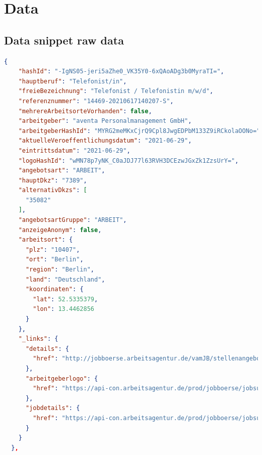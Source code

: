 \documentclass[12pt, a4paper, titlepage]{article}
\begin{document}


\clearpage





\newpage
\appendix
\section{Data}
\subsection{Data snippet raw data}
\begin{lstlisting}[language=json]
  {
    "hashId": "-IgNS05-jeri5aZhe0_VK35Y0-6xQAoADg3b0MyraTI=",
    "hauptberuf": "Telefonist/in",
    "freieBezeichnung": "Telefonist / Telefonistin m/w/d",
    "referenznummer": "14469-20210617140207-S",
    "mehrereArbeitsorteVorhanden": false,
    "arbeitgeber": "aventa Personalmanagement GmbH",
    "arbeitgeberHashId": "MYRG2meMKxCjrQ9Cpl8JwgEDPbM133Z9iRCkolaOONo=",
    "aktuelleVeroeffentlichungsdatum": "2021-06-29",
    "eintrittsdatum": "2021-06-29",
    "logoHashId": "wMN78p7yNK_C0aJDJ77l63RVH3DCEzwJGxZk1ZzsUrY=",
    "angebotsart": "ARBEIT",
    "hauptDkz": "7389",
    "alternativDkzs": [
      "35082"
    ],
    "angebotsartGruppe": "ARBEIT",
    "anzeigeAnonym": false,
    "arbeitsort": {
      "plz": "10407",
      "ort": "Berlin",
      "region": "Berlin",
      "land": "Deutschland",
      "koordinaten": {
        "lat": 52.5335379,
        "lon": 13.4462856
      }
    },
    "_links": {
      "details": {
        "href": "http://jobboerse.arbeitsagentur.de/vamJB/stellenangebotAnzeigen.html?bencs=xZ8NQKDByg2g6avJgLLIrGwqlXZQi1GKNAI%2BzAoCWJ5RD6egZDnwqMFj%2B4AnUX6XN5nyEJ7NKSdBBr1EvlmnVw%3D%3D"
      },
      "arbeitgeberlogo": {
        "href": "https://api-con.arbeitsagentur.de/prod/jobboerse/jobsuche-service/ed/v1/arbeitgeberlogo/wMN78p7yNK_C0aJDJ77l63RVH3DCEzwJGxZk1ZzsUrY="
      },
      "jobdetails": {
        "href": "https://api-con.arbeitsagentur.de/prod/jobboerse/jobsuche-service/pc/v1/jobdetails/-IgNS05-jeri5aZhe0_VK35Y0-6xQAoADg3b0MyraTI="
      }
    }
  },
\end{lstlisting}
\end{document}
